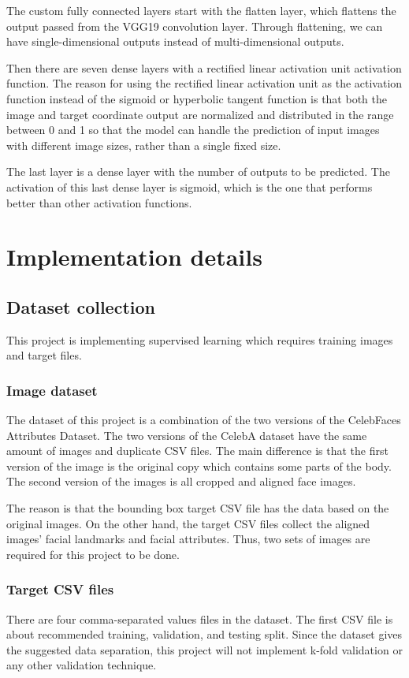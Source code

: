 \documentclass{article}
\begin{document}
The custom fully connected layers start with the flatten layer, which flattens the output passed from the VGG19 convolution layer. Through flattening, we can have single-dimensional outputs instead of multi-dimensional outputs. 

Then there are seven dense layers with a rectified linear activation unit activation function. The reason for using the rectified linear activation unit as the activation function instead of the sigmoid or hyperbolic tangent function is that both the image and target coordinate output are normalized and distributed in the range between 0 and 1 so that the model can handle the prediction of input images with different image sizes, rather than a single fixed size. 

The last layer is a dense layer with the number of outputs to be predicted. The activation of this last dense layer is sigmoid, which is the one that performs better than other activation functions.


\section{Implementation details}
\label{detail}

\subsection{Dataset collection}
This project is implementing supervised learning which requires training images and target files.

\subsubsection{Image dataset}
The dataset of this project is a combination of the two versions of the CelebFaces Attributes Dataset. The two versions of the CelebA dataset have the same amount of images and duplicate CSV files. The main difference is that the first version of the image is the original copy which contains some parts of the body. The second version of the images is all cropped and aligned face images. 

The reason is that the bounding box target CSV file has the data based on the original images. On the other hand,  the target CSV files collect the aligned images' facial landmarks and facial attributes. Thus, two sets of images are required for this project to be done.

\subsubsection{Target CSV files}
There are four comma-separated values files in the dataset.
The first CSV file is about recommended training, validation, and testing split. Since the dataset gives the suggested data separation, this project will not implement k-fold validation or any other validation technique. 
\end{document}
